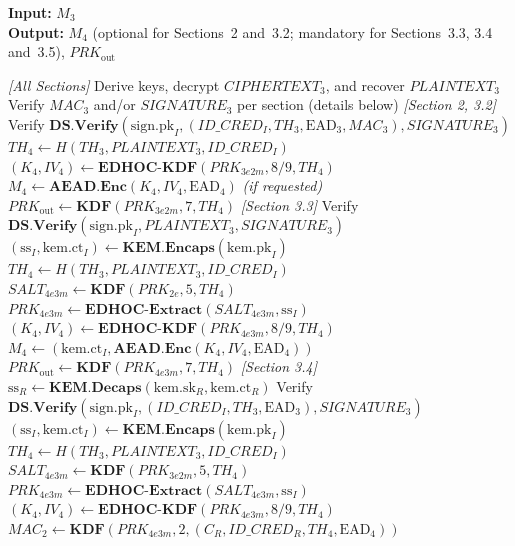 \documentclass{easychair}
\begin{document}
\begin{algorithm}[H]
\caption{Step 4 (Responder) --- Process $M_3$ and Prepare $M_4$}
\label{alg:step4}
\textbf{Input:} $M_3$ \\
\textbf{Output:} $M_4$ (optional for Sections~2 and~3.2; mandatory for Sections~3.3, 3.4 and~3.5), $PRK_{\mathrm{out}}$
\begin{algorithmic}[1]
\Statex \textit{[All Sections]}
\State Derive keys, decrypt $CIPHERTEXT_3$, and recover $PLAINTEXT_3$
\State Verify $MAC_3$ and/or $SIGNATURE_3$ per section (details below)
\Statex \textit{[Section 2, 3.2]} 
\State Verify $\mathbf{DS.Verify}(\mathrm{sign.pk}_I, (ID\_CRED_I, TH_3, \mathrm{EAD}_3, MAC_3), SIGNATURE_3)$
\State $TH_4 \gets H(TH_3, PLAINTEXT_3, ID\_CRED_I)$
\State $(K_4, IV_4) \gets \mathbf{EDHOC\text{-}KDF}(PRK_{3e2m}, 8\text{/}9, TH_4)$
\State $M_4 \gets \mathbf{AEAD.Enc}(K_4, IV_4, \mathrm{EAD}_4)$ \quad\textit{(if requested)}
\State $PRK_{\mathrm{out}} \gets \mathbf{KDF}(PRK_{3e2m}, 7, TH_4)$
\Statex \textit{[Section 3.3]} 
\State Verify $\mathbf{DS.Verify}(\mathrm{sign.pk}_I, PLAINTEXT_3, SIGNATURE_3)$
\State $(\mathrm{ss}_I, \mathrm{kem.ct}_I) \gets \mathbf{KEM.Encaps}(\mathrm{kem.pk}_I)$
\State $TH_4 \gets H(TH_3, PLAINTEXT_3, ID\_CRED_I)$
\State $SALT_{4e3m} \gets \mathbf{KDF}(PRK_{2e}, 5, TH_4)$
\State $PRK_{4e3m} \gets \mathbf{EDHOC\text{-}Extract}(SALT_{4e3m}, \mathrm{ss}_I)$
\State $(K_4, IV_4) \gets \mathbf{EDHOC\text{-}KDF}(PRK_{4e3m}, 8\text{/}9, TH_4)$
\State $M_4 \gets (\mathrm{kem.ct}_I, \mathbf{AEAD.Enc}(K_4, IV_4, \mathrm{EAD}_4))$
\State $PRK_{\mathrm{out}} \gets \mathbf{KDF}(PRK_{4e3m}, 7, TH_4)$
\Statex \textit{[Section 3.4]} 
\State $\mathrm{ss}_R \gets \mathbf{KEM.Decaps}(\mathrm{kem.sk}_R, \mathrm{kem.ct}_R)$
\State Verify $\mathbf{DS.Verify}(\mathrm{sign.pk}_I, (ID\_CRED_I, TH_3, \mathrm{EAD}_3), SIGNATURE_3)$
\State $(\mathrm{ss}_I, \mathrm{kem.ct}_I) \gets \mathbf{KEM.Encaps}(\mathrm{kem.pk}_I)$
\State $TH_4 \gets H(TH_3, PLAINTEXT_3, ID\_CRED_I)$
\State $SALT_{4e3m} \gets \mathbf{KDF}(PRK_{3e2m}, 5, TH_4)$
\State $PRK_{4e3m} \gets \mathbf{EDHOC\text{-}Extract}(SALT_{4e3m}, \mathrm{ss}_I)$
\State $(K_4, IV_4) \gets \mathbf{EDHOC\text{-}KDF}(PRK_{4e3m}, 8\text{/}9, TH_4)$
\State $MAC_2 \gets \mathbf{KDF}(PRK_{4e3m}, 2, (C_R, ID\_CRED_R, TH_4, \mathrm{EAD}_4))$

\end{algorithmic}
\end{algorithm}
\end{document}
